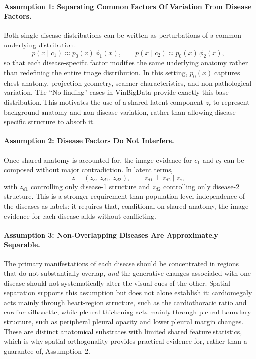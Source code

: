 \paragraph{Assumption 1: Separating Common Factors Of Variation From Disease Factors.}
Both single-disease distributions can be written as perturbations of a common underlying distribution:
\begin{equation}
    p(x \mid c_1) \approx p_0(x)\,\phi_1(x),
    \qquad
    p(x \mid c_2) \approx p_0(x)\,\phi_2(x),
\end{equation}
so that each disease-specific factor modifies the same underlying anatomy rather than redefining the entire image distribution.
In this setting, $p_0(x)$ captures chest anatomy, projection geometry, scanner characteristics, and non-pathological variation.
The ``No finding'' cases in VinBigData provide exactly this base distribution.
This motivates the use of a shared latent component $z_c$ to represent background anatomy and non-disease variation, rather than allowing disease-specific structure to absorb it.

\paragraph{Assumption 2: Disease Factors Do Not Interfere.}
Once shared anatomy is accounted for, the image evidence for $c_1$ and $c_2$ can be composed without major contradiction.
In latent terms,
\begin{equation}
    z = (z_c,\, z_{d1},\, z_{d2}),
    \qquad
    z_{d1} \perp z_{d2} \mid z_c,
    \label{eq:latent_factorisation}
\end{equation}
with $z_{d1}$ controlling only disease-1 structure and $z_{d2}$ controlling only disease-2 structure.
This is a stronger requirement than population-level independence of the diseases as labels: it requires that, conditional on shared anatomy, the image evidence for each disease adds without conflicting.

\paragraph{Assumption 3: Non-Overlapping Diseases Are Approximately Separable.}
The primary manifestations of each disease should be concentrated in regions that do not substantially overlap, \emph{and} the generative changes associated with one disease should not systematically alter the visual cues of the other.
Spatial separation supports this assumption but does not alone establish it: cardiomegaly acts mainly through heart-region structure, such as the cardiothoracic ratio and cardiac silhouette, while pleural thickening acts mainly through pleural boundary structure, such as peripheral pleural opacity and lower pleural margin changes.
These are distinct anatomical substrates with limited shared feature statistics, which is why spatial orthogonality provides practical evidence for, rather than a guarantee of, Assumption~2.


